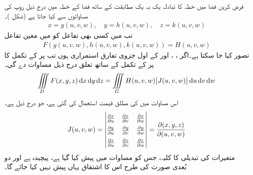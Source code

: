 فرض کریں  فضا میں خطہ  کا تبادلہ  یک بہ یک مطابقت کے  ساتھ  فضا کے خطہ  میں درج ذیل  روپ کی مساواتوں  سے کیا جاتا ہے (شکل )۔
\begin{align*}
x=g(u,v,w),\quad y=h(u,v,w),\quad z=k(u,v,w)
\end{align*}
تب  میں کسی بھی تفاعل  کو  میں   معین  تفاعل
\begin{align*}
F(g(u,v,w),h(u,v,w),k(u,v,w))=H(u,v,w)
\end{align*}
تصور کیا جا سکتا ہے۔اگر ،   ، اور  کے اول جزوی تفارق استمراری ہوں تب  پر  کے تکمل کا  پر  کے تکمل کے ساتھ تعلق درج ذیل مساوات دے گی۔
  \begin{align}\label{مساوات_بالکثرت_یعقوبی_تہرا_تکمل}
\iiint\limits_D F(x,y,z)\dif x\dif y\dif z=\iiint\limits_G H(u,v,w)\abs{J(u,v,w)}\dif u\dif v\dif w
\end{align}
اس مساوات میں  کی مطلق قیمت استعمال کی گئی ہے،  جو درج ذیل    ہے۔
\begin{align}
\renewcommand{\arraystretch}{1.5}
J(u,v,w)=\begin{vmatrix}
\frac{\partial x}{\partial u}&\frac{\partial x}{\partial v}&\frac{\partial x}{\partial w}\\
\frac{\partial y}{\partial u}&\frac{\partial y}{\partial v}&\frac{\partial y}{\partial w}\\
\frac{\partial z}{\partial u}&\frac{\partial z}{\partial v}&\frac{\partial z}{\partial w}
\end{vmatrix}=\frac{\partial(x,y,z)}{\partial(u,v,w)}
\end{align} 
متغیرات کی تبدیلی کا    کلیہ، جس کو مساوات  میں پیش کیا گیا ہے، پیچیدہ ہے اور دو بُعدی صورت کی طرح  اس کا اشتقاق یہاں پیش نہیں کیا جائے گا۔
